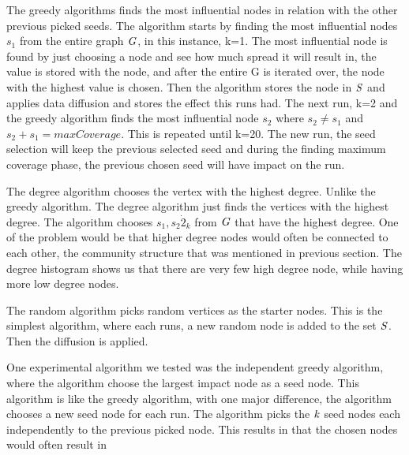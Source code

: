 The greedy algorithms finds the most influential nodes in relation with the other previous picked seeds. The algorithm starts by finding the most influential nodes $s_1$ from the entire graph $\it{G}$, in this instance, k=1. The most influential node is found by just choosing a node and see how much spread it will result in, the value is stored with the node, and after the entire G is iterated over, the node with the highest value is chosen. Then the algorithm stores the node in $\it{S}$ and applies data diffusion and stores the effect this runs had. The next run, k=2 and the greedy algorithm finds the most influential node $s_2$ where $s_2 \neq s_1$ and $s_2 +s_1 = maxCoverage$. This is repeated until k=20. The new run, the seed selection will keep the previous selected seed and during the finding maximum coverage phase, the previous chosen seed will have impact on the run.

The degree algorithm chooses the vertex with the highest degree. Unlike the greedy algorithm. The degree algorithm just finds the vertices with the highest degree. The algorithm chooses $s_1, s_2 \dot 2_k$ from $\it{G}$ that have the highest degree. One of the problem would be that higher degree nodes would often be connected to each other, the community structure that was mentioned in previous section. The degree histogram shows us that there are very few high degree node, while having more low degree nodes.

The random algorithm picks random vertices as the starter nodes. This is the simplest algorithm, where each runs, a new random node is added to the set $\it{S}$. Then the diffusion is applied. 

One experimental algorithm we tested was the independent greedy algorithm, where the algorithm choose the largest impact node as a seed node. This algorithm is like the greedy algorithm, with one major difference, the algorithm chooses a new seed node for each run. The algorithm picks the $\it{k}$ seed nodes each independently to the previous picked node. This results in that the chosen nodes would often result in  
